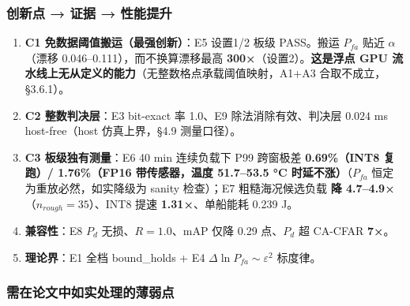 \subsubsection{创新点 → 证据 →
性能提升}\label{ux521bux65b0ux70b9-ux8bc1ux636e-ux6027ux80fdux63d0ux5347}

\begin{enumerate}
\def\labelenumi{\arabic{enumi}.}
\tightlist
\item
  \textbf{C1 免数据阈值搬运（最强创新）}：E5 设置1/2 板级 PASS。搬运
  \(P_{fa}\) 贴近 \(\alpha\)（漂移 0.046--0.111），而不换算漂移最高
  \textbf{300×}（设置2）。\textbf{这是浮点 GPU
  流水线上无从定义的能力}（无整数格点承载阈值映射，A1+A3
  合取不成立，§3.6.1）。
\item
  \textbf{C2 整数判决层}：E3 bit-exact 率 1.0、E9 除法消除有效、判决层
  \(0.024\) ms host-free（host 仿真上界，§4.9 测量口径）。
\item
  \textbf{C3 板级独有测量}：E6 40 min 连续负载下 P99 跨窗极差
  \textbf{0.69\%（INT8 复跑）/ 1.76\%（FP16 带传感器，温度 51.7--53.5 °C
  时延不涨）}（\(P_{fa}\) 恒定为重放必然，如实降级为 sanity 检查）；E7
  粗糙海况候选负载 \textbf{降 4.7--4.9×}（\(n_{rough}=35\)）、INT8 提速
  \textbf{1.31×}、单船能耗 0.239 J。
\item
  \textbf{兼容性}：E8 \(P_d\) 无损、\(R=1.0\)、mAP 仅降 0.29 点、\(P_d\)
  超 CA-CFAR \textbf{7×}。
\item
  \textbf{理论界}：E1 全档 bound\_holds + E4
  \(\Delta\ln P_{fa}\sim\varepsilon^2\) 标度律。
\end{enumerate}

\subsubsection{需在论文中如实处理的薄弱点}\label{ux9700ux5728ux8bbaux6587ux4e2dux5982ux5b9eux5904ux7406ux7684ux8584ux5f31ux70b9}

